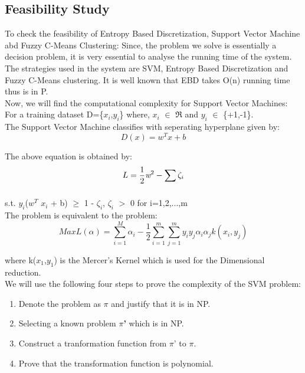 \documentclass[12pt,a4paper,final]{report}
\DeclareRobustCommand{\gobblefive}[5]{}
\newcommand*{\SkipTocEntry}{\addtocontents{toc}{\gobblefive}}
\begin{document}
{{{{{\SkipTocEntry\subsection{Feasibility Study}
To check the feasibility of Entropy Based Discretization, Support Vector Machine abd Fuzzy C-Means Clustering:
\newline Since, the problem we solve is essentially a decision problem, it is very essential to analyse the running time of the system. The strategies used in the system are SVM, Entropy Based Discretization and Fuzzy C-Means clustering. It is well known that EBD takes O(n) running time thus is in P.\\
\newline
Now, we will find the computational complexity for Support Vector Machines:\\
For a training dataset D=\{$x_i$,$y_i$\} where, $x_i$ $\in$ $\Re$ and $y_i$ $\in$ \{+1,-1\}.\\
The Support Vector Machine classifies with seperating hyperplane given by:\\

\begin{equation}
D(x)=w^Tx+b
\end{equation}

The above equation is obtained by:
\begin{equation}
L=\frac{1}{2} \emph{w}^2 - \sum_{}^{} \zeta_i
\end{equation}

s.t. $y_i$($w^T$ $x_i$ + b) $\geq$ 1 - $\zeta_i$, $\zeta_i$ $>$ 0 for i=1,2,...,m \\
\newline The problem is equivalent to the problem:\\
\begin{equation}
Max L(\alpha)= \sum_{i=1}^{M} \alpha_i - \frac{1}{2} \sum_{i=1}^{m}\sum_{j=1}^{m} y_iy_j\alpha_i\alpha_jk(x_i,y_j)
\end{equation}

where k($x_1$,$y_1$) is the Mercer's Kernel which is used for the 
Dimensional reduction.\\
\newline We will use the following four steps to prove the complexity of the SVM problem:
\begin{enumerate}
\item
Denote the problem as \textbf{$\pi$} and justify that it is in NP.
\item
Selecting a known problem \textbf{$\pi$'} which is in NP.
\item
Construct a tranformation function from $\pi$' to $\pi$.
\item
Prove that the transformation function is polynomial.
\end{enumerate}
\begin{itemize}


\end{itemize}}}}}}
\end{document}
